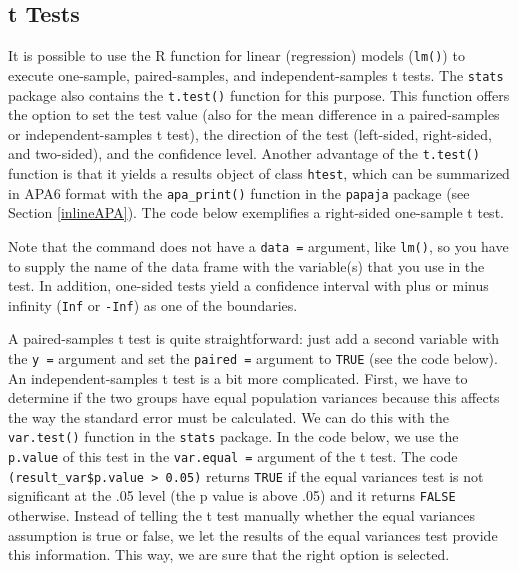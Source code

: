 \documentclass[doc,floatsintext]{apa6}
\newenvironment{Shaded}{\begin{snugshade}}{\end{snugshade}}
\newcommand{\KeywordTok}[1]{\textcolor[rgb]{0.13,0.29,0.53}{\textbf{#1}}}
\newcommand{\DataTypeTok}[1]{\textcolor[rgb]{0.13,0.29,0.53}{#1}}
\newcommand{\FloatTok}[1]{\textcolor[rgb]{0.00,0.00,0.81}{#1}}
\newcommand{\StringTok}[1]{\textcolor[rgb]{0.31,0.60,0.02}{#1}}
\newcommand{\CommentTok}[1]{\textcolor[rgb]{0.56,0.35,0.01}{\textit{#1}}}
\newcommand{\OperatorTok}[1]{\textcolor[rgb]{0.81,0.36,0.00}{\textbf{#1}}}
\newcommand{\NormalTok}[1]{#1}
\begin{document}
\subsection{t Tests}\label{ttests}

It is possible to use the R function for linear (regression) models
(\texttt{lm()}) to execute one-sample, paired-samples, and
independent-samples t tests. The \texttt{stats} package also contains
the \texttt{t.test()} function for this purpose. This function offers
the option to set the test value (also for the mean difference in a
paired-samples or independent-samples t test), the direction of the test
(left-sided, right-sided, and two-sided), and the confidence level.
Another advantage of the \texttt{t.test()} function is that it yields a
results object of class \texttt{htest}, which can be summarized in APA6
format with the \texttt{apa\_print()} function in the \texttt{papaja}
package (see Section \ref{inlineAPA}). The code below exemplifies a
right-sided one-sample t test.

\begin{Shaded}
\end{Shaded}

Note that the command does not have a \texttt{data\ =} argument, like
\texttt{lm()}, so you have to supply the name of the data frame with the
variable(s) that you use in the test. In addition, one-sided tests yield
a confidence interval with plus or minus infinity (\texttt{Inf} or
\texttt{-Inf}) as one of the boundaries.

A paired-samples t test is quite straightforward: just add a second
variable with the \texttt{y\ =} argument and set the \texttt{paired\ =}
argument to \texttt{TRUE} (see the code below). An independent-samples t
test is a bit more complicated. First, we have to determine if the two
groups have equal population variances because this affects the way the
standard error must be calculated. We can do this with the
\texttt{var.test()} function in the \texttt{stats} package. In the code
below, we use the \texttt{p.value} of this test in the
\texttt{var.equal\ =} argument of the t test. The code
\texttt{(result\_var\$p.value\ \textgreater{}\ 0.05)} returns
\texttt{TRUE} if the equal variances test is not significant at the .05
level (the p value is above .05) and it returns \texttt{FALSE}
otherwise. Instead of telling the t test manually whether the equal
variances assumption is true or false, we let the results of the equal
variances test provide this information. This way, we are sure that the
right option is selected.
\end{document}
